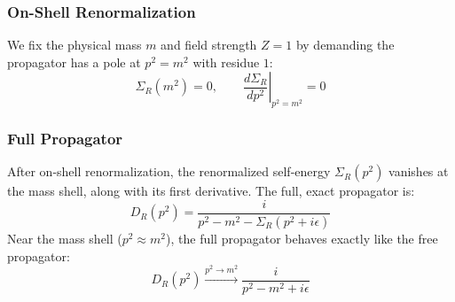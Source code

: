 \documentclass{article}
\begin{document}
\subsubsection*{On-Shell Renormalization}
We fix the physical mass $m$ and field strength $Z=1$ by demanding the propagator has a pole at $p^2=m^2$ with residue $1$:
\begin{equation}
    \Sigma_R(m^2) = 0, \qquad \left.\frac{d\Sigma_R}{dp^2}\right|_{p^2=m^2} = 0
\end{equation}
\subsubsection*{Full Propagator}
After on-shell renormalization, the renormalized self-energy $\Sigma_R(p^2)$ vanishes at the mass shell, along with its first derivative. The full, exact propagator is:
\begin{equation}
    D_R(p^2) = \frac{i}{p^2 - m^2 - \Sigma_R(p^2 + i\epsilon)}
\end{equation}
Near the mass shell ($p^2 \approx m^2$), the full propagator behaves exactly like the free propagator:
\begin{equation}
    D_R(p^2) \xrightarrow{p^2 \to m^2} \frac{i}{p^2 - m^2 + i\epsilon}
\end{equation}
\end{document}
